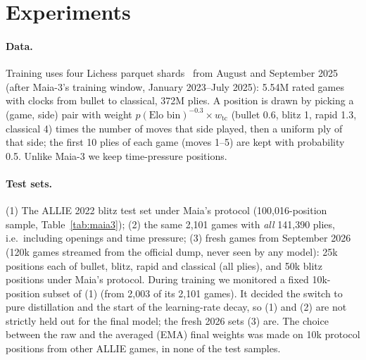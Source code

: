 \section{Experiments}
\paragraph{Data.} Training uses four Lichess parquet shards~\cite{lichess} from August and September
2025 (after Maia-3's training window, January 2023--July 2025): 5.54M rated games with clocks from
bullet to classical, 372M plies. A position is drawn by picking a (game, side) pair with weight
$p(\text{Elo bin})^{-0.3}\times w_{\text{tc}}$ (bullet 0.6, blitz 1, rapid 1.3, classical 4) times
the number of moves that side played, then a uniform ply of that side; the first 10 plies of each
game (moves 1--5) are kept with probability 0.5. Unlike Maia-3 we keep time-pressure positions.

\paragraph{Test sets.} (1) The ALLIE 2022 blitz test set under Maia's protocol (100,016-position
sample, Table~\ref{tab:maia3}); (2) the same 2,101 games with \emph{all} 141,390 plies, i.e.\ including
openings and time pressure; (3) fresh games from September 2026 (120k games streamed from the
official dump, never seen by any model): 25k positions each of bullet, blitz, rapid and classical
(all plies), and 50k blitz positions under Maia's protocol.
During training we monitored a fixed 10k-position subset of (1) (from 2,003 of its 2,101 games). It
decided the switch to pure distillation and the start of the learning-rate decay, so (1) and (2) are
not strictly held out for the final model; the fresh 2026 sets (3) are. The choice between the raw and
the averaged (EMA) final weights was made on 10k protocol positions from other ALLIE games, in none
of the test samples.


